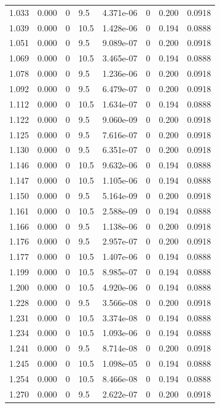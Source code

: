 \documentclass[preview]{standalone}
\begin{document}
{{{\begin{tabular}{L{1.2cm}C{1.2cm} C{0.3cm}C{0.5cm} C{1.4cm}C{1.4cm} C{1.4cm}C{1.4cm}}
  1.033  &  0.000  & 0     & 9.5 &  4.371e-06  & 0  & 0.200 &  0.0918   \\ 
  1.039  &  0.000  & 0     & 10.5 &  1.428e-06  & 0  & 0.194 &  0.0888   \\ 
  1.051  &  0.000  & 0     & 9.5 &  9.089e-07  & 0  & 0.200 &  0.0918   \\ 
  1.069  &  0.000  & 0     & 10.5 &  3.465e-07  & 0  & 0.194 &  0.0888   \\ 
  1.078  &  0.000  & 0     & 9.5 &  1.236e-06  & 0  & 0.200 &  0.0918   \\ 
  1.092  &  0.000  & 0     & 9.5 &  6.479e-07  & 0  & 0.200 &  0.0918   \\ 
  1.112  &  0.000  & 0     & 10.5 &  1.634e-07  & 0  & 0.194 &  0.0888   \\ 
  1.122  &  0.000  & 0     & 9.5 &  9.060e-09  & 0  & 0.200 &  0.0918   \\ 
  1.125  &  0.000  & 0     & 9.5 &  7.616e-07  & 0  & 0.200 &  0.0918   \\ 
  1.130  &  0.000  & 0     & 9.5 &  6.351e-07  & 0  & 0.200 &  0.0918   \\ 
  1.146  &  0.000  & 0     & 10.5 &  9.632e-06  & 0  & 0.194 &  0.0888   \\ 
  1.147  &  0.000  & 0     & 10.5 &  1.105e-06  & 0  & 0.194 &  0.0888   \\ 
  1.150  &  0.000  & 0     & 9.5 &  5.164e-09  & 0  & 0.200 &  0.0918   \\ 
  1.161  &  0.000  & 0     & 10.5 &  2.588e-09  & 0  & 0.194 &  0.0888   \\ 
  1.166  &  0.000  & 0     & 9.5 &  1.138e-06  & 0  & 0.200 &  0.0918   \\ 
  1.176  &  0.000  & 0     & 9.5 &  2.957e-07  & 0  & 0.200 &  0.0918   \\ 
  1.177  &  0.000  & 0     & 10.5 &  1.407e-06  & 0  & 0.194 &  0.0888   \\ 
  1.199  &  0.000  & 0     & 10.5 &  8.985e-07  & 0  & 0.194 &  0.0888   \\ 
  1.200  &  0.000  & 0     & 10.5 &  4.920e-06  & 0  & 0.194 &  0.0888   \\ 
  1.228  &  0.000  & 0     & 9.5 &  3.566e-08  & 0  & 0.200 &  0.0918   \\ 
  1.231  &  0.000  & 0     & 10.5 &  3.374e-08  & 0  & 0.194 &  0.0888   \\ 
  1.234  &  0.000  & 0     & 10.5 &  1.093e-06  & 0  & 0.194 &  0.0888   \\ 
  1.241  &  0.000  & 0     & 9.5 &  8.714e-08  & 0  & 0.200 &  0.0918   \\ 
  1.245  &  0.000  & 0     & 10.5 &  1.098e-05  & 0  & 0.194 &  0.0888   \\ 
  1.254  &  0.000  & 0     & 10.5 &  8.466e-08  & 0  & 0.194 &  0.0888   \\ 
  1.270  &  0.000  & 0     & 9.5 &  2.622e-07  & 0  & 0.200 &  0.0918   \\ 
\hline 
\end{tabular} 

}}}
\end{document}
